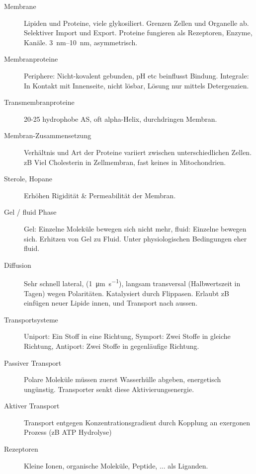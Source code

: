 \documentclass[a4paper,twocolumn,english,fontsize=7,DIV=16]{scrartcl}
\begin{document}
\begin{description}
	\item[Membrane] Lipiden und Proteine, viele glykosiliert. Grenzen
		Zellen und Organelle ab. Selektiver Import und Export. Proteine
		fungieren als Rezeptoren, Enzyme, Kanäle. \SIrange{3}{10}{\nm},
		asymmetrisch.
	\item[Membranproteine] Periphere: Nicht-kovalent gebunden, pH etc
		beinflusst Bindung. Integrale: In Kontakt mit Innenseite, nicht
		lösbar, Lösung nur mittels Detergenzien.
	\item[Transmembranproteine] 20-25 hydrophobe AS, oft alpha-Helix,
		durchdringen Membran.
	\item[Membran-Zusammensetzung] Verhältnis und Art der Proteine variiert
		zwischen unterschiedlichen Zellen. zB Viel Cholesterin in
		Zellmembran, fast keines in Mitochondrien.
	\item[Sterole, Hopane] Erhöhen Rigidität \& Permeabilität der Membran.
	\item[Gel / fluid Phase] Gel: Einzelne Moleküle bewegen sich nicht
		mehr, fluid: Einzelne bewegen sich. Erhitzen von Gel zu Fluid.
		Unter physiologischen Bedingungen eher fluid.
	\item[Diffusion] Sehr schnell lateral, (\SI{1}{\um \per \s}), langsam
		transversal (Halbwertszeit in Tagen) wegen Polaritäten.
		Katalysiert durch Flippasen. Erlaubt zB einfügen neuer Lipide
		innen, und Transport nach aussen.
	\item[Transportsysteme] Uniport: Ein Stoff in eine Richtung, Symport:
		Zwei Stoffe in gleiche Richtung, Antiport: Zwei Stoffe in
		gegenläufige Richtung.
	\item[Passiver Transport] Polare Moleküle müssen zuerst Wasserhülle
		abgeben, energetisch ungünstig. Transporter senkt diese
		Aktivierungsenergie.
	\item[Aktiver Transport] Transport entgegen Konzentrationsgradient
		durch Kopplung an exergonen Prozess (zB ATP Hydrolyse)
	\item[Rezeptoren] Kleine Ionen, organische Moleküle, Peptide, ... als
		Liganden.
\end{description}
\end{document}

